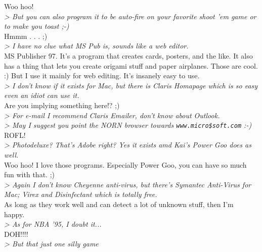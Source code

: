 \documentclass[11pt,twoside,a4paper]{article}
\begin{document}
\begin{multicols*}{2}
Woo hoo!~\\

\emph{> But you can also program it to be auto-fire on your favorite shoot 'em game or to make you toast ;-)}~\\

Hmmm . . . ;)~\\

\emph{> I have no clue what MS Pub is, sounds like a web editor.}~\\

MS Publisher 97.  It's a program that creates cards, posters, and the like. It also has a thing that lets you create origami stuff and paper airplanes. Those are cool.  :)  But I use it mainly for web editing.  It's insanely easy to use.~\\

\emph{> I don't know if it exists for Mac, but there is Claris Homapage which is so easy even an idiot can use it.}~\\

Are you implying something here!?  ;)~\\

\emph{> For e-mail I recommend Claris Emailer, don't know about Outlook.}~\\
\emph{> May I suggest you point the NORN browser towards \texttt{www.micro\$soft.com} :-)}~\\

ROFL!~\\

\emph{> Photodeluxe? That's Adobe right? Yes it exists amd Kai's Power Goo does as well. }~\\

Woo hoo!  I love those programs.  Especially Power Goo, you can have so much fun with that.  ;)~\\

\emph{> Again I don't know Cheyenne anti-virus, but there's Symantec Anti-Virus for Mac; Virex and Disinfectant which is totally free.}~\\

As long as they work well and can detect a lot of unknown stuff, then I'm happy.~\\

\emph{> As for NBA '95, I doubt it...}~\\

DOH!!!!~\\

\emph{> But that just one silly game}~\\


\end{multicols*}
\end{document}
